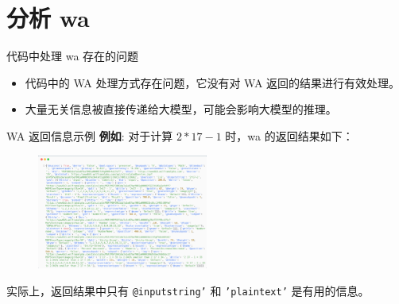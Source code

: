 \section{分析 wa}


\begin{frame}{代码中处理 wa 存在的问题}
	\begin{itemize}
		\item 代码中的 WA 处理方式存在问题，它没有对 WA 返回的结果进行有效处理。
		      \bigskip
		\item 大量无关信息被直接传递给大模型，可能会影响大模型的推理。
	\end{itemize}
\end{frame}

\begin{frame}{WA 返回信息示例}
	\textbf{例如}: 对于计算 $ 2*17-1 $ 时，wa 的返回结果如下：
	\begin{figure}
		\includegraphics[width=0.5\textwidth]{./pic/2.png}
	\end{figure}

	实际上，返回结果中只有 \texttt{@inputstring'} 和 \texttt{'plaintext'} 是有用的信息。
\end{frame}

